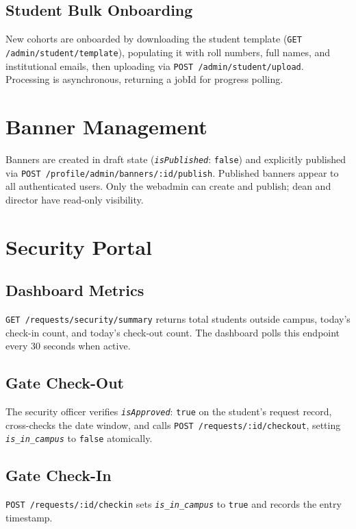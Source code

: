\documentclass[12pt,a4paper]{report}
\newcommand{\api}[1]{\texttt{\small #1}}
\newcommand{\field}[1]{\texttt{\textit{#1}}}
\newcommand{\code}[1]{\texttt{#1}}
\begin{document}
\subsection{Student Bulk Onboarding}

New cohorts are onboarded by downloading the student template (\api{GET /admin/student/template}), populating it with roll numbers, full names, and institutional emails, then uploading via \api{POST /admin/student/upload}. Processing is asynchronous, returning a jobId for progress polling.

\section{Banner Management}

Banners are created in draft state (\field{isPublished}: \code{false}) and explicitly published via \api{POST /profile/admin/banners/:id/publish}. Published banners appear to all authenticated users. Only the webadmin can create and publish; dean and director have read-only visibility.

\section{Security Portal}

\subsection{Dashboard Metrics}

\api{GET /requests/security/summary} returns total students outside campus, today's check-in count, and today's check-out count. The dashboard polls this endpoint every 30 seconds when active.

\subsection{Gate Check-Out}

The security officer verifies \field{isApproved}: \code{true} on the student's request record, cross-checks the date window, and calls \api{POST /requests/:id/checkout}, setting \field{is\_in\_campus} to \code{false} atomically.

\subsection{Gate Check-In}

\api{POST /requests/:id/checkin} sets \field{is\_in\_campus} to \code{true} and records the entry timestamp.
\end{document}

